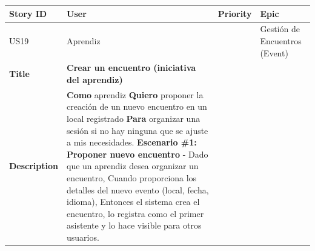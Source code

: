 {\def\LTcaptype{none} %
\begin{longtable}[]{@{}
  >{\raggedright\arraybackslash}p{}
  >{\raggedright\arraybackslash}p{}
  >{\raggedright\arraybackslash}p{}
  >{\raggedright\arraybackslash}p{}@{}}
\toprule\noalign{}
\begin{minipage}[b]{\linewidth}\raggedright
Story ID
\end{minipage} & \begin{minipage}[b]{\linewidth}\raggedright
User
\end{minipage} & \begin{minipage}[b]{\linewidth}\raggedright
Priority
\end{minipage} & \begin{minipage}[b]{\linewidth}\raggedright
Epic
\end{minipage} \\
\midrule\noalign{}
\endhead
\bottomrule\noalign{}
\endlastfoot
US19 & Aprendiz & 8 & Gestión de Encuentros (Event) \\
\textbf{Title} & \textbf{Crear un encuentro (iniciativa del aprendiz)} &
& \\
\textbf{Description} & \textbf{Como} aprendiz \textbf{Quiero} proponer
la creación de un nuevo encuentro en un local registrado \textbf{Para}
organizar una sesión si no hay ninguna que se ajuste a mis necesidades.
\textbf{Escenario \#1: Proponer nuevo encuentro} - Dado que un aprendiz
desea organizar un encuentro, Cuando proporciona los detalles del nuevo
evento (local, fecha, idioma), Entonces el sistema crea el encuentro, lo
registra como el primer asistente y lo hace visible para otros usuarios.
& & \\
\end{longtable}
}

